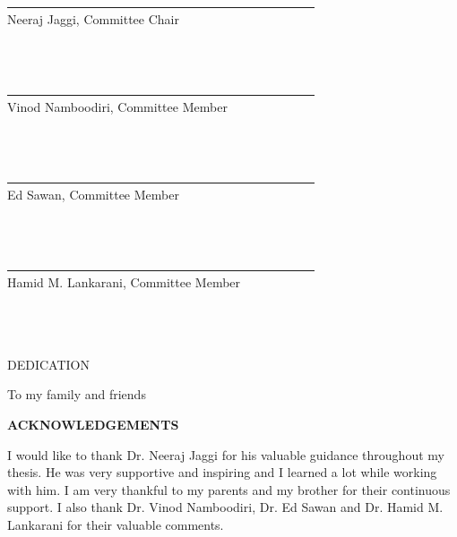 \documentclass[12pt,letterpaper,english]{article}
\begin{document}
\noindent \underline{~~~~~~~~~~~~~~~~~~~~~~~~~~~~~~~~~~~~~~~~~~~~~~~~~}\\
\noindent Neeraj Jaggi, Committee Chair\\ \\ \\ \\
\noindent \underline{~~~~~~~~~~~~~~~~~~~~~~~~~~~~~~~~~~~~~~~~~~~~~~~~~}\\
\noindent Vinod Namboodiri, Committee Member\\ \\ \\ \\
\noindent \underline{~~~~~~~~~~~~~~~~~~~~~~~~~~~~~~~~~~~~~~~~~~~~~~~~~}\\
\noindent Ed Sawan, Committee Member\\ \\ \\ \\
\noindent \underline{~~~~~~~~~~~~~~~~~~~~~~~~~~~~~~~~~~~~~~~~~~~~~~~~~}\\
\noindent Hamid M. Lankarani, Committee Member\\ \\ \\ \\
\newpage
\begin{center}DEDICATION\end{center}
\singlespacing
\vspace{2.0in}
\begin{center}
To my family and friends
\end{center}
\doublespacing
\newpage
\begin{center}\textbf{ACKNOWLEDGEMENTS}\end{center}
\doublespacing
\hspace{0.5in}I would like to thank Dr. Neeraj Jaggi for his valuable guidance throughout my thesis. He was very supportive and inspiring and I learned a lot while working with him. 
I am very thankful to my parents and my brother for their continuous support.
I also thank Dr. Vinod Namboodiri, Dr. Ed Sawan and Dr. Hamid M. Lankarani for their valuable comments.
\newpage
\end{document}
